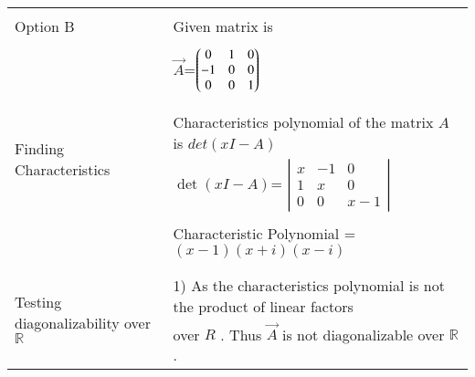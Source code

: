 \documentclass[journal,12pt]{IEEEtran}
\begin{document}
\begin{longtable}{|l|l|}
\hline \hline
\multirow{3}{*}{Option B} & \\
& Given matrix is  \\
&\\
& $\vec{A}$=$\begin{pmatrix}0&1&0\\-1&0&0\\0&0&1\end{pmatrix}$\\
&\\
\hline
\multirow{3}{*}{Finding Characteristics} & \\
&
Characteristics polynomial of the matrix $A$ is $det(xI-A)$\\ 
polynomial
& $\det(xI-A)$= $\left|
                \begin{array}{ccc}
                x & -1 & 0\\
                1 & x & 0\\
                0 & 0 & x-1
                \end{array} \right|$  \\
&\\
& Characteristic Polynomial = $(x-1)(x+i)(x-i)$\\
&\\
\hline
\multirow{3}{*}{Testing diagonalizability over $\mathbb{R}$} & \\
& 1) As the characteristics  polynomial is not the product of linear factors\\
&over $R$ . Thus $\vec{A}$ is not diagonalizable over $\mathbb{R}$.\\


\end{longtable}
\end{document}
